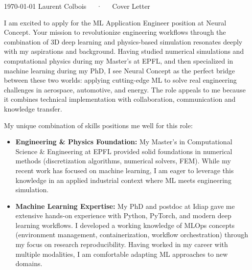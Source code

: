 \documentclass[11pt, a4paper]{awesome-cv}
\begin{document}
\makecvheader[C]

\makecvfooter
  {\today}
  {Laurent Colbois~~~·~~~Cover Letter}
  {}

\makelettertitle

\begin{cvletter}

I am excited to apply for the ML Application Engineer position at Neural Concept. Your mission to revolutionize engineering workflows through the combination of 3D deep learning and physics-based simulation resonates deeply with my aspirations and background. Having studied numerical simulations and computational physics during my Master's at EPFL, and then specialized in machine learning during my PhD, I see Neural Concept as the perfect bridge between these two worlds: applying cutting-edge ML to solve real engineering challenges in aerospace, automotive, and energy. The role appeals to me because it combines technical implementation with collaboration, communication and knowledge transfer. 

My unique combination of skills positions me well for this role:
\begin{itemize}
\item\textbf{Engineering \& Physics Foundation:} My Master's in Computational Science \& Engineering at EPFL provided solid foundations in numerical methods (discretization algorithms, numerical solvers, FEM). While my recent work has focused on machine learning, I am eager to leverage this knowledge in an applied industrial context where ML meets engineering simulation. 

\item\textbf{Machine Learning Expertise:} My PhD and postdoc at Idiap gave me extensive hands-on experience with Python, PyTorch, and modern deep learning workflows. I developed a working knowledge of MLOps concepts (environment management, containerization, workflow orchestration) through my focus on research reproducibility. Having worked in my career with multiple modalities, I am comfortable adapting ML approaches to new domains.


\end{itemize}
\end{cvletter}
\end{document}
